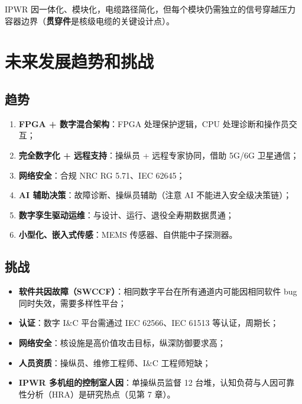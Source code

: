 \documentclass[
  UTF8,
  scheme=plain,
  fontsize=10pt,
  openany
]{ctexbook}
\begin{document}
IPWR
因一体化、模块化，电缆路径简化，但每个模块仍需独立的信号穿越压力容器边界（\textbf{贯穿件}是核级电缆的关键设计点）。

\section{未来发展趋势和挑战}\label{ux672aux6765ux53d1ux5c55ux8d8bux52bfux548cux6311ux6218}

\subsection{趋势}\label{ux8d8bux52bf}

\begin{enumerate}
\def\labelenumi{\arabic{enumi}.}
\tightlist
\item
  \textbf{FPGA + 数字混合架构}：FPGA 处理保护逻辑，CPU
  处理诊断和操作员交互；
\item
  \textbf{完全数字化 + 远程支持}：操纵员 + 远程专家协同，借助 5G/6G
  卫星通信；
\item
  \textbf{网络安全}：合规 NRC RG 5.71、IEC 62645；
\item
  \textbf{AI 辅助决策}：故障诊断、操纵员辅助（注意 AI
  不能进入安全级决策链）；
\item
  \textbf{数字孪生驱动运维}：与设计、运行、退役全寿期数据贯通；
\item
  \textbf{小型化、嵌入式传感}：MEMS 传感器、自供能中子探测器。
\end{enumerate}

\subsection{挑战}\label{ux6311ux6218-1}

\begin{itemize}
\tightlist
\item
  \textbf{软件共因故障（SWCCF）}：相同数字平台在所有通道内可能因相同软件
  bug 同时失效，需要多样性平台；
\item
  \textbf{认证}：数字 I\&C 平台需通过 IEC 62566、IEC 61513
  等认证，周期长；
\item
  \textbf{网络安全}：核设施是高价值攻击目标，纵深防御要求高；
\item
  \textbf{人员资质}：操纵员、维修工程师、I\&C 工程师短缺；
\item
  \textbf{IPWR 多机组的控制室人因}：单操纵员监督 12
  台堆，认知负荷与人因可靠性分析（HRA）是研究热点（见第 7 章）。
\end{itemize}
\end{document}
